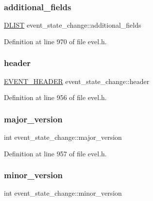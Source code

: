 \subsubsection{\texorpdfstring{additional\+\_\+fields}{additional\_fields}}
{\footnotesize\ttfamily \hyperlink{double__list_8h_a45f4a129042d9e1aa4ffd31fe13e4d14}{D\+L\+I\+ST} event\+\_\+state\+\_\+change\+::additional\+\_\+fields}



Definition at line 970 of file evel.\+h.

\hypertarget{structevent__state__change_ae1c42b89a04ec5c3852ed9519894f4c5}{}\label{structevent__state__change_ae1c42b89a04ec5c3852ed9519894f4c5} 
\subsubsection{\texorpdfstring{header}{header}}
{\footnotesize\ttfamily \hyperlink{evel_8h_aa0ea94c675729365ea7825c4fc7e06d8}{E\+V\+E\+N\+T\+\_\+\+H\+E\+A\+D\+ER} event\+\_\+state\+\_\+change\+::header}



Definition at line 956 of file evel.\+h.

\hypertarget{structevent__state__change_af815301b2c08b674501a77a5956effdf}{}\label{structevent__state__change_af815301b2c08b674501a77a5956effdf} 
\subsubsection{\texorpdfstring{major\+\_\+version}{major\_version}}
{\footnotesize\ttfamily int event\+\_\+state\+\_\+change\+::major\+\_\+version}



Definition at line 957 of file evel.\+h.

\hypertarget{structevent__state__change_a84c7c8a91ea8937dfcfa5cdc6cec8d83}{}\label{structevent__state__change_a84c7c8a91ea8937dfcfa5cdc6cec8d83} 
\subsubsection{\texorpdfstring{minor\+\_\+version}{minor\_version}}
{\footnotesize\ttfamily int event\+\_\+state\+\_\+change\+::minor\+\_\+version}



